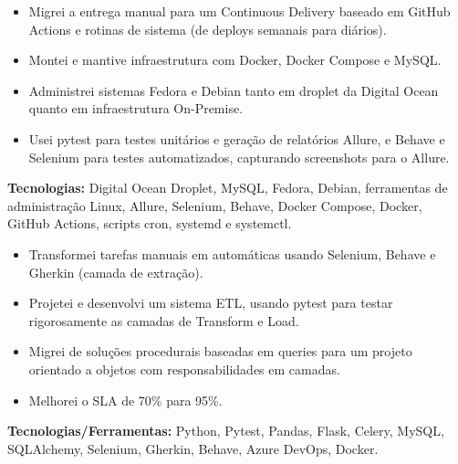 \documentclass[10pt,a4paper]{altacv}
\begin{document}
\vspace{5mm}

\begin{itemize}
    \setlength{\itemindent}{0.5em}
    \item[--] Migrei a entrega manual para um Continuous Delivery baseado em GitHub Actions e rotinas de sistema (de deploys semanais para diários).
    \item[--] Montei e mantive infraestrutura com Docker, Docker Compose e MySQL.
    \item[--] Administrei sistemas Fedora e Debian tanto em droplet da Digital Ocean quanto em infraestrutura On-Premise.
    \item[--] Usei pytest para testes unitários e geração de relatórios Allure, e Behave e Selenium para testes automatizados, capturando screenshots para o Allure.
\end{itemize}
\textbf{Tecnologias:} Digital Ocean Droplet, MySQL, Fedora, Debian, ferramentas de administração Linux, Allure, Selenium, Behave, Docker Compose, Docker, GitHub Actions, scripts cron, systemd e systemctl.
\vspace{5mm}

\break
{}

\begin{itemize}
    \setlength{\itemindent}{0.5em}
    \item[--] Transformei tarefas manuais em automáticas usando Selenium, Behave e Gherkin (camada de extração).
    \item[--] Projetei e desenvolvi um sistema ETL, usando pytest para testar rigorosamente as camadas de Transform e Load.
    \item[--] Migrei de soluções procedurais baseadas em queries para um projeto orientado a objetos com responsabilidades em camadas.
    \item[--] Melhorei o SLA de 70\% para 95\%.
\end{itemize}
\textbf{Tecnologias/Ferramentas:} Python, Pytest, Pandas, Flask, Celery, MySQL, SQLAlchemy, Selenium, Gherkin, Behave, Azure DevOps, Docker.
\vspace{5mm}
\end{document}
